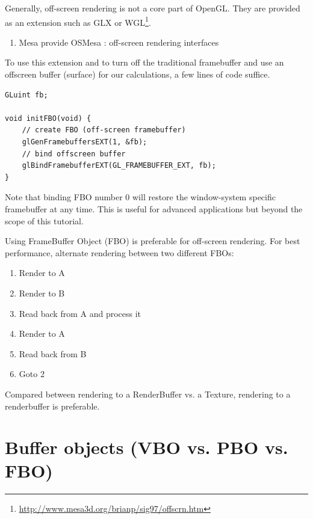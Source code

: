 Generally, off-screen rendering is not a core part of OpenGL. They are
provided as an extension such as GLX or
WGL\footnote{\url{http://www.mesa3d.org/brianp/sig97/offscrn.htm}}.  
\begin{enumerate}
\item Mesa provide OSMesa : off-screen rendering interfaces
\end{enumerate}

To use this extension and to turn off the traditional framebuffer and
use an offscreen buffer (surface) for our calculations, a few lines of
code suffice. 
\begin{verbatim}
GLuint fb;

void initFBO(void) {
    // create FBO (off-screen framebuffer)
    glGenFramebuffersEXT(1, &fb);
    // bind offscreen buffer
    glBindFramebufferEXT(GL_FRAMEBUFFER_EXT, fb);
}
\end{verbatim}


\begin{framed}
  Note that binding FBO number 0 will restore the window-system
  specific framebuffer at any time. This is useful for advanced
  applications but beyond the scope of this tutorial.
\end{framed}

Using FrameBuffer Object (FBO) is preferable for off-screen
rendering. For best performance, alternate rendering between two
different FBOs:
\begin{enumerate}
\item Render to A
\item Render to B
\item Read back from A and process it
\item Render to A
\item Read back from B
\item Goto 2
\end{enumerate}

Compared between rendering to a RenderBuffer vs. a Texture, rendering
to a renderbuffer is preferable. 


\section{Buffer objects (VBO vs. PBO vs. FBO)}
\label{sec:buffer-objects}


